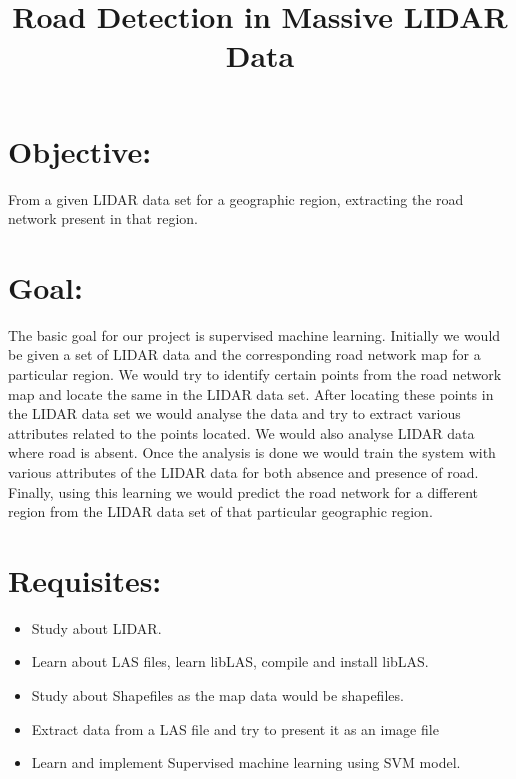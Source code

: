\documentclass[12pt,letterpaper]{article}
\begin{document}
\title{Road Detection in Massive LIDAR Data}
\maketitle

\section{Objective:}
From a given LIDAR data set for a geographic region, extracting the road network present in that region.

\section{Goal:} 
The basic goal for our project is supervised machine learning. Initially we would be given a set of LIDAR data and the corresponding road network map for a particular region. We would try to identify certain points from the road network map and locate the same in the LIDAR data set. After locating these points in the LIDAR data set we would analyse the data and try to extract various attributes related to the points located. We would also analyse LIDAR data where road is absent. Once the analysis is done we would train the system with various attributes of the LIDAR data for both absence and presence of road. Finally, using this learning we would predict the road network for a different region from the LIDAR data set of that particular geographic region.

\section{Requisites:}
\begin{itemize}
\item Study about LIDAR.
\item Learn about LAS files, learn libLAS, compile and install libLAS.
\item Study about Shapefiles as the map data would be shapefiles.
\item Extract data from a LAS file and try to present it as an image file
\item Learn and implement Supervised machine learning using SVM model.
\end{itemize}
\end{document}
